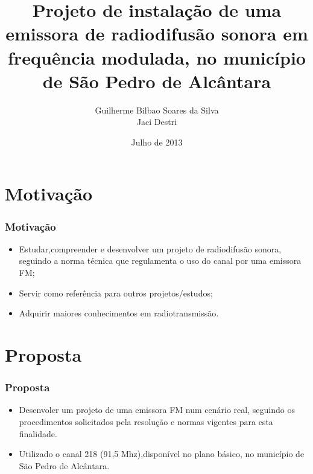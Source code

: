 \documentclass{beamer}
\title{Projeto de instalação de uma emissora de radiodifusão sonora em frequência modulada, no município de São Pedro de Alcântara}
\subtitle{}
\author[Guilherme Bilbao Soares da Silva]{Guilherme Bilbao Soares da Silva\\Jaci Destri}
\institute[IFSC]{
    Instituto Federal de Santa Catarina -- IFSC\\
    Campus São José \\
    \url{}
    }
\date{Julho de 2013}
\begin{document}
    \begin{frame}
	    \maketitle
    \end{frame}



    \section{Motivação}
    \begin{frame}
    \frametitle{Motivação}
      \begin{itemize}
      
      \item Estudar,compreender e desenvolver um projeto de radiodifusão sonora, seguindo a norma técnica que regulamenta o uso do canal por uma emissora FM;
	\item Servir como referência para outros projetos/estudos;
	\item Adquirir maiores conhecimentos em radiotransmissão.
	\end{itemize}

    \end{frame}


    \section{Proposta}

    \begin{frame}
	    \frametitle{Proposta}
      \begin{itemize}

	    \item Desenvoler um projeto de uma emissora FM num cenário real,
	    seguindo os procedimentos solicitados pela resolução
	    e normas vigentes para esta finalidade.   
	    
	    \item Utilizado o canal 218 (91,5 Mhz),disponível no plano básico,
	    no município de São Pedro de Alcântara.
	\end{itemize}    
	  
    \end{frame}
    
\end{document}
